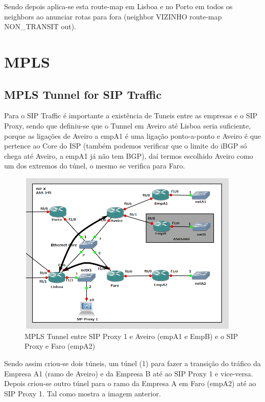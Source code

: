 \documentclass[11pt,a4paper]{report}
\begin{document}
Sendo depois aplica-se esta route-map em Lisboa e no Porto em todos os neighbors ao anunciar rotas para fora (neighbor VIZINHO route-map NON\_TRANSIT out).

\chapter{MPLS}

\section{MPLS Tunnel for SIP Traffic}

Para o SIP Traffic é importante a existência de Tuneis entre as empresas e o SIP Proxy, sendo que definiu-se que o Tunnel em Aveiro até Lisboa seria suficiente, porque as ligações de Aveiro a empA1 é uma ligação ponto-a-ponto e Aveiro é que pertence ao Core do ISP (também podemos verificar que o limite do iBGP só chega até Aveiro, a empA1 já não tem BGP), daí termos escolhido Aveiro como um dos extremos do túnel, o mesmo se verifica para Faro.\\

\begin{figure}[H]
\centerline{\includegraphics[width=300pt]{network_tunnel.png}}
\caption{MPLS Tunnel entre SIP Proxy 1 e Aveiro (empA1 e EmpB) e o SIP Proxy e Faro (empA2)}
\label{schema}
\end{figure}


Sendo assim criou-se dois túneis, um túnel (1) para fazer a transição do tráfico da Empresa A1 (ramo de Aveiro) e da Empresa B até ao SIP Proxy 1 e vice-versa. Depois criou-se outro túnel para o ramo da Empresa A em Faro (empA2) até ao SIP Proxy 1. Tal como mostra a imagem anterior.\\
\end{document}
